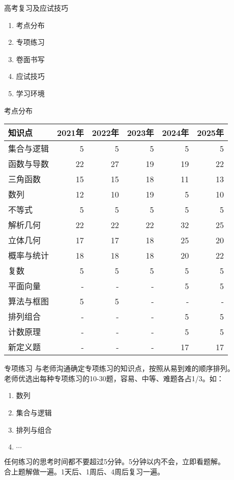 \documentclass[aspectratio=169]{ctexbeamer} %
\date{\today}
\begin{document}
\begin{frame}[t]{高考复习及应试技巧}
\begin{enumerate}[label={\arabic*.}]
\item 考点分布
\item 专项练习
\item 卷面书写
\item 应试技巧
\item 学习环境
\end{enumerate}
\end{frame}

\begin{frame}[t]{考点分布}
\begin{longtable}{@{} l r r r r r @{}}
\toprule
知识点 & 2021年 & 2022年 & 2023年 & 2024年 & 2025年 \\
\midrule
集合与逻辑 & 5 & 5 & 5 & 5 & 5 \\
函数与导数 & 22 & 27 & 19 & 19 & 22 \\
三角函数 & 15 & 15 & 18 & 11 & 13 \\
数列 & 12 & 10 & 19 & 5 & 10 \\
不等式 & 5 & 5 & 5 & 5 & 5 \\
解析几何 & 22 & 22 & 22 & 32 & 25 \\
立体几何 & 17 & 17 & 18 & 25 & 20 \\
概率与统计 & 18 & 18 & 18 & 20 & 22 \\
复数 & 5 & 5 & 5 & 5 & 5 \\
平面向量 & - & - & - & 5 & 5 \\
算法与框图 & 5 & 5 & - & - & - \\
排列组合 & - & - & - & 5 & 5 \\
计数原理 & - & - & - & 5 & 5 \\
新定义题 & - & - & - & 17 & 17 \\
\bottomrule
\end{longtable}
\end{frame}

\begin{frame}[t]{专项练习}
与老师沟通确定专项练习的知识点，按照从易到难的顺序排列。\\
老师优选出每种专项练习的10-30题，容易、中等、难题各占1/3。如：\\
\begin{enumerate}[label={\arabic*.}]
\item 数列
\item 集合与逻辑
\item 排列与组合
\item $\cdots$
\end{enumerate}
\alert{任何练习的思考时间都不要超过5分钟。5分钟以内不会，立即看题解。} \\
\alert{合上题解做一遍。1天后、1周后、4周后复习一遍。} \\

\end{frame}
\end{document}
